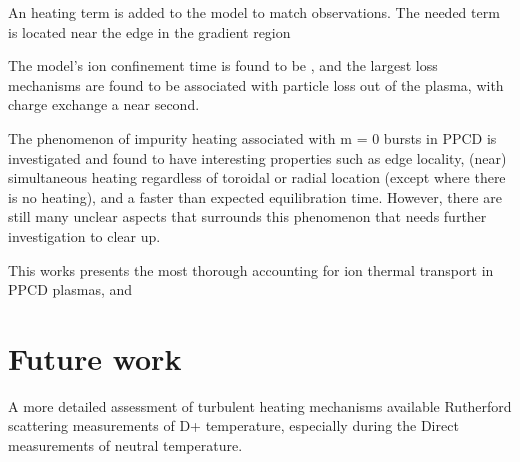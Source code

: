 \begin{refsection}

An \adhoc heating term is added to the model to match observations. The needed \adhoc term is located near the edge in the gradient region

The model's ion confinement time is found to be , and the largest loss mechanisms are found to be associated with particle loss out of the plasma, with charge exchange a near second. 

The phenomenon of impurity heating associated with m = 0 bursts in PPCD is investigated and found to have interesting properties such as edge locality, (near) simultaneous heating regardless of toroidal or radial location (except where there is no heating), and a faster than expected equilibration time. However, there are still many unclear aspects that surrounds this phenomenon that needs further investigation to clear up. 


This works presents the most thorough accounting for ion thermal transport in PPCD plasmas, and 



\section{Future work}
A more detailed assessment of turbulent heating mechanisms available 
Rutherford scattering measurements of D+ temperature, especially during the 
Direct measurements of neutral temperature. 


\printbibliography
\end{refsection}